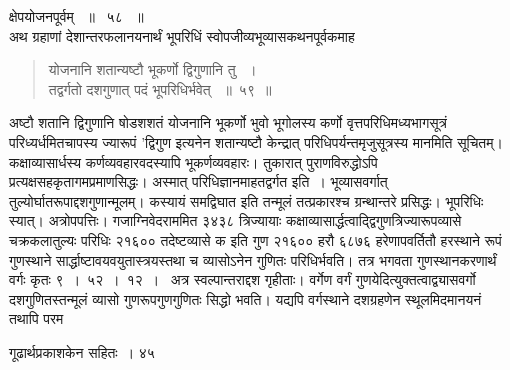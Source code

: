 \documentclass[11pt, openany]{book}
\begin{document}
\begin{sloppypar}
\noindent क्षेपयोजनपूर्वम् ~॥~ ५८~ ॥\\
\noindent अथ ग्रहाणां देशान्तरफलानयनार्थं भूपरिधिं स्वोपजीव्यभूव्यासकथनपूर्वकमाह\textendash
\end{sloppypar}
\begin{quote}

 {\ssi योजनानि शतान्यष्टौ भूकर्णो द्विगुणानि तु ~।\\
 तद्वर्गतो दशगुणात् पदं भूपरिधिर्भवेत् ~॥~५९~॥}
\end{quote}
\begin{sloppypar}
अष्टौ शतानि द्विगुणानि षोडशशतं योजनानि भूकर्णो भुवो भूगोलस्य कर्णो वृत्तपरिधिमध्यभागसूत्रं परिध्यर्धमितचापस्य ज्यारूपं 'द्विगुण इत्यनेन शतान्यष्टौ केन्द्रात् परिधिपर्यन्तमृजुसूत्रस्य मानमिति सूचितम्। कक्षाव्यासार्धस्य कर्णव्यवहारवदस्यापि भूकर्णव्यवहारः। तुकारात् पुराणविरुद्धोऽपि प्रत्यक्षसहकृतागमप्रमाणसिद्धः। अस्मात् परिधिज्ञानमाह\textendash तद्वर्गत इति~। भूव्यासवर्गात् तुल्योर्घातरूपाद्दशगुणान्मूलम्। कस्यायं समद्विघात इति तन्मूलं तत्प्रकारश्च ग्रन्थान्तरे प्रसिद्धः। भूपरिधिः स्यात्।  अत्रोपपत्तिः। गजाग्निवेदराममित ३४३८ त्रिज्यायाः कक्षाव्यासार्द्धत्वाद्द्विगुणत्रिज्यारूपव्यासे चक्रकलातुल्यः परिधिः २१६०० तदेष्टव्यासे क इति गुण २१६०० हरौ ६८७६ हरेणापवर्तितौ हरस्थाने रूपं गुणस्थाने सार्द्धाष्टावयवयुतास्त्रयस्तथा च व्यासोऽनेन गुणितः परिधिर्भवति। तत्र भगवता गुणस्थानकरणार्थं वर्गः कृतः ९~।~५२~।~१२~।~ अत्र स्वल्पान्तराद्दश गृहीताः। वर्गेण वर्गं गुणयेदित्युक्तत्वाद्व्यासवर्गो दशगुणितस्तन्मूलं व्यासो गुणरूपगुणगुणितः सिद्धो भवति। यद्यपि वर्गस्थाने दशग्रहणेन स्थूलमिदमानयनं तथापि परम\textendash
\end{sloppypar}

 \newpage

\hspace{3cm} गूढार्थप्रकाशकेन सहितः~। \hfill ४५
\vspace{1cm}
\end{document}
